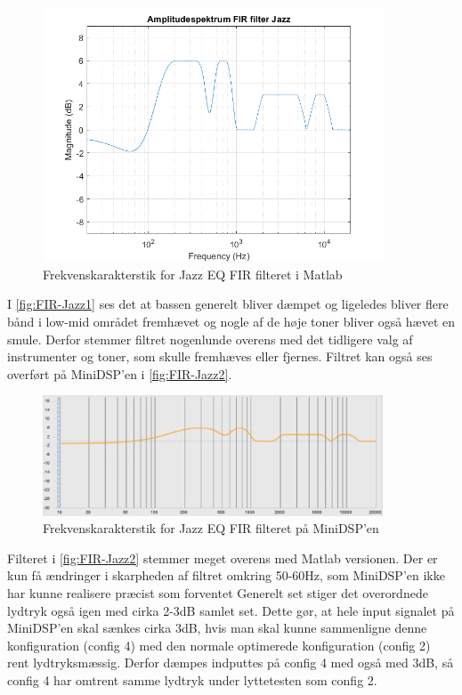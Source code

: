 \begin{figure}[H]
	\center
	\includegraphics[width=0.9\textwidth]{figur/FIR-Jazz1}
	\caption{Frekvenskarakterstik for Jazz EQ FIR filteret i Matlab}
	\label{fig:FIR-Jazz1}
\end{figure}
I \autoref{fig:FIR-Jazz1} ses det at bassen generelt bliver dæmpet og ligeledes bliver flere bånd i low-mid området fremhævet og nogle af de høje toner bliver også hævet en smule. Derfor stemmer filtret nogenlunde overens med det tidligere valg af instrumenter og toner, som skulle fremhæves eller fjernes. Filtret kan også ses overført på MiniDSP'en i \autoref{fig:FIR-Jazz2}.

\begin{figure}[H]
	\center
	\includegraphics[width=0.9\textwidth]{figur/FIR-Jazz2}
	\caption{Frekvenskarakterstik for Jazz EQ FIR filteret på MiniDSP'en}
	\label{fig:FIR-Jazz2}
\end{figure}
Filteret i \autoref{fig:FIR-Jazz2} stemmer meget overens med Matlab versionen. Der er kun få ændringer i skarpheden af filtret omkring 50-60Hz, som MiniDSP'en ikke har kunne realisere præcist som forventet  Generelt set stiger det overordnede lydtryk også igen med cirka 2-3dB samlet set. Dette gør, at hele input signalet på MiniDSP'en skal sænkes cirka 3dB, hvis man skal kunne sammenligne denne konfiguration (config 4) med den normale optimerede konfiguration (config 2) rent lydtryksmæssig. Derfor dæmpes indputtes på config 4 med også med 3dB, så config 4 har omtrent samme lydtryk under lyttetesten som config 2.  

